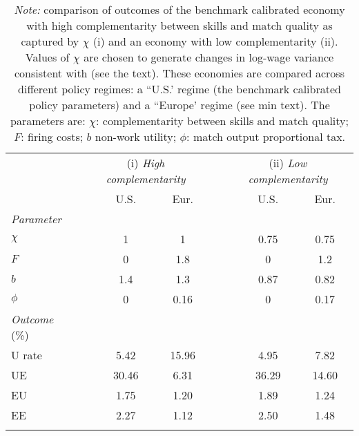 \begin{table}[!h]
\small
\centering
{}
\label{tab:secular_urate}
\begin{tabular}{l ccc c ccc}
\hline \hline
\addlinespace
 & \multicolumn{3}{c}{(i) \textit{High complementarity} } &  & \multicolumn{3}{c}{(ii) \textit{Low complementarity} }   \\  
\addlinespace
\hspace{80pt}           & \hspace{10pt}   & U.S. & Eur. &  & \hspace{10pt}  & U.S. & Eur.             \\  
\addlinespace
\addlinespace
\textit{Parameter} &                        \\  
\addlinespace
\hspace{4pt}  $\chi$  &  &1 & 1 &  &  &0.75 & 0.75\\
\hspace{4pt}  $F$  &  &0 & 1.8 &  &  &0 & 1.2\\
\hspace{4pt}  $b$  &  &1.4 & 1.3 &  &  &0.87 & 0.82\\
\hspace{4pt}  $\phi$  &  &0 & 0.16 &  &  &0 & 0.17\\
\addlinespace
\addlinespace
\textit{Outcome} (\%)   &                 \\  
\addlinespace
\hspace{4pt}  U rate  &  &5.42 & 15.96 &  &  &4.95 & 7.82\\
\hspace{4pt}  UE  &  &30.46 & 6.31 &  &  &36.29 & 14.60\\
\hspace{4pt}  EU  &  &1.75 & 1.20 &  &  &1.89 & 1.24\\
\hspace{4pt}  EE  &  &2.27 & 1.12 &  &  &2.50 & 1.48\\
\addlinespace
\addlinespace
\hline \hline
\end{tabular}
\caption*{\footnotesize{\textit{Note:} comparison of outcomes of the benchmark calibrated economy with high complementarity between skills and match quality as captured by $\chi$ (i) and an economy with low complementarity (ii). Values of $\chi$ are chosen to generate changes in log-wage variance consistent with \cite{kambourov_manovskii_2009_Restud} (see the text). These economies are compared across different policy regimes: a ``U.S.' regime (the benchmark calibrated policy parameters) and a ``Europe' regime (see min text). The parameters are: $\chi$: complementarity between skills and match quality; $F$: firing costs; $b$ non-work utility; $\phi$: match output proportional tax.  }}
\end{table}